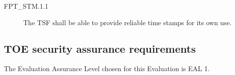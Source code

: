 \documentclass[12pt,english]{scrbook}
\begin{document}



\begin{description}
\item[FPT{\_}STM.1.1]

The TSF shall be able to provide reliable time stamps for its own use.

\end{description}





\subsection{TOE security assurance requirements}

The Evaluation Assurance Level chosen for this Evaluation is EAL 1.
\end{document}
